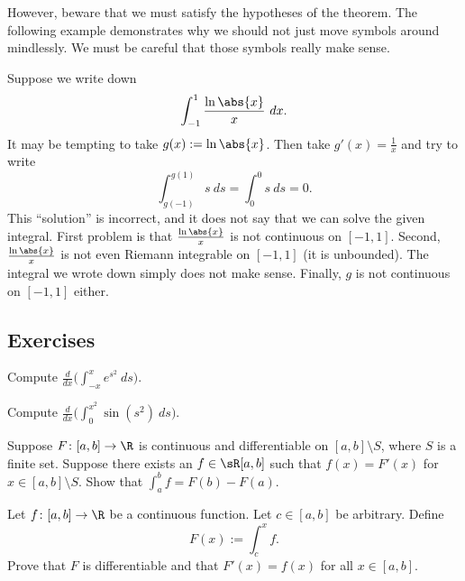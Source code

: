 \documentclass[12pt]{book}
\begin{document}
However, beware that we must satisfy the hypotheses of the theorem.
The
following example demonstrates why we should not just 
move symbols around mindlessly.
We must be careful that those symbols really make sense.

\begin{example}
Suppose we write down
\begin{equation*}
\int_{-1}^{1} \frac{\ln \abs{x}}{x} ~dx .
\end{equation*}
It may be tempting to take $g(x) := \ln \abs{x}$.
Then take $g'(x) =
\frac{1}{x}$ and try to write
\begin{equation*}
\int_{g(-1)}^{g(1)} s ~ds = 
\int_{0}^{0} s ~ds = 0. 
\end{equation*}
This ``solution'' is incorrect, and it does not say
that we can solve the given integral.
First problem is that
$\frac{\ln \abs{x}}{x}$ is not continuous on $[-1,1]$.
Second, $\frac{\ln \abs{x}}{x}$ is not even Riemann integrable on $[-1,1]$
(it is unbounded).
The integral we wrote down simply does not make sense.
Finally, $g$ is not continuous on $[-1,1]$ either.
\end{example}

\subsection*{Exercises}

\begin{exercise}
Compute
$\displaystyle
\frac{d}{dx} \biggl( \int_{-x}^x e^{s^2}~ds \biggr)$.
\end{exercise}

\begin{exercise}
Compute
$\displaystyle
\frac{d}{dx} \biggl( \int_{0}^{x^2} \sin(s^2)~ds \biggr)$.
\end{exercise}

\begin{exercise}
Suppose $F \colon [a,b] \to \R$ is continuous and differentiable
on $[a,b] \setminus S$, where $S$ is a finite set.
Suppose there
exists an $f \in \sR[a,b]$ such that $f(x) = F'(x)$ for $x \in [a,b]
\setminus S$.
Show that
$\int_a^b f = F(b)-F(a)$.
\end{exercise}

\begin{exercise} \label{secondftc:exercise}
Let $f \colon [a,b] \to \R$ be a continuous function.
Let $c \in [a,b]$
be arbitrary.
Define
\begin{equation*}
F(x) := \int_c^x f .
\end{equation*}
Prove that $F$ is differentiable and that $F'(x) = f(x)$ for all $x \in
[a,b]$.
\end{exercise}
\end{document}
